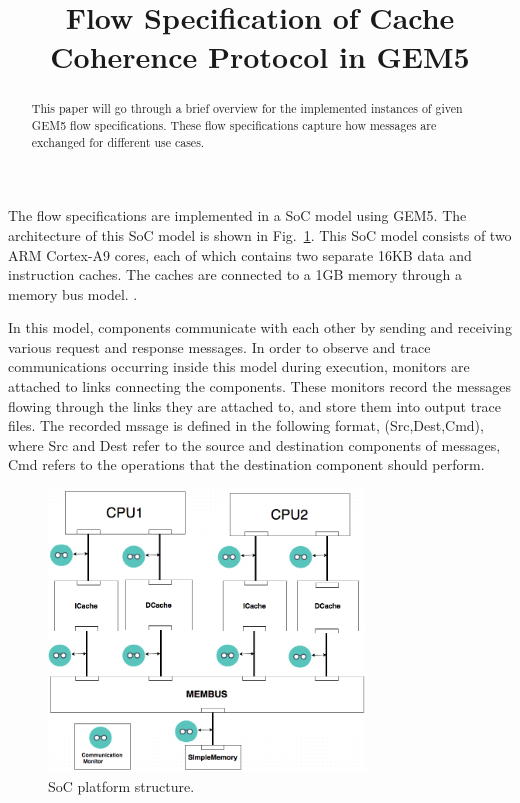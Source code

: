 \documentclass[conference]{IEEEtran}
\begin{document}
\title{Flow Specification of Cache Coherence Protocol in GEM5}

\maketitle


\begin{abstract}
This paper will go through a brief overview for the implemented instances of given GEM5 flow specifications. These flow specifications capture how messages are exchanged for different use cases. 
\end{abstract}

The flow specifications are implemented in a SoC model using GEM5. The architecture of this SoC model is shown in Fig.~\ref{SoC}. This SoC model consists of two ARM Cortex-A9 cores, each of which contains two separate 16KB data and instruction caches.  The caches are connected to a 1GB memory through a memory bus model.  .  

In this model, components communicate with each other by sending and receiving various request and response messages.  In order to observe and trace communications occurring inside this model during execution, monitors are attached to links connecting the components. These monitors record the messages flowing through the links they are attached to, and store them into output trace files. The recorded mssage is defined in the following format, (Src,Dest,Cmd), where Src and Dest refer to the source and destination components of messages, Cmd refers to the operations that the destination component should perform. 

\begin{figure} 
\centerline{
\includegraphics[width=3.3in]{figures/Fig4.png}}
\caption{SoC platform structure.}
\label{SoC}
\end{figure}
\end{document}
